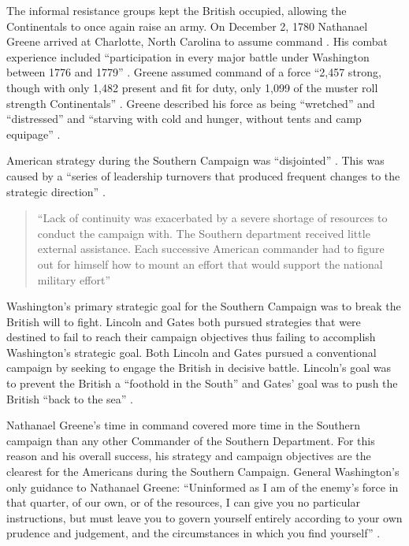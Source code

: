 The informal resistance groups kept the British occupied, allowing the
Continentals to once again raise an army.  On December 2, 1780 Nathanael Greene
arrived at Charlotte, North Carolina to assume command \cite[p.22]{moncure_cowpens_1996}.
His combat experience included “participation in every major battle under
Washington between 1776 and 1779” \cite[5]{babits_devil_2001}.  Greene assumed command of a
force “2,457 strong, though with only 1,482 present and fit for duty, only 1,099
of the muster roll strength Continentals”  \cite[27]{weigley_partisan_1970}.
Greene described his force as being “wretched” and “distressed” and “starving
with cold and hunger, without tents and camp equipage”
\cite[23]{moncure_cowpens_1996}. 

American strategy during the Southern Campaign was “disjointed”
\cite[p.60]{woodward_comparative_2002}.
This was caused by a “series of leadership turnovers that produced
frequent changes to the strategic direction”
\cite[61]{woodward_comparative_2002}.  

\begin{quote}
“Lack of continuity was exacerbated by a severe shortage of resources to conduct
the campaign with.  The Southern department received little external assistance.
Each successive American commander had to figure out for himself how to mount an
effort that would support the national military effort”
\cite[p.61]{woodward_comparative_2002}
\end{quote}

Washington's primary strategic goal for the Southern Campaign was to break the
British will to fight.  Lincoln and Gates both pursued strategies that were
destined to fail to reach their campaign objectives thus failing to accomplish
Washington’s strategic goal.  Both Lincoln and Gates pursued a conventional
campaign by seeking to engage the British in decisive battle.  Lincoln’s goal
was to prevent the British a “foothold in the South” and Gates’ goal was to push
the British “back to the sea” \cite[p.64]{woodward_comparative_2002}. 

Nathanael Greene’s time in command covered more time in the Southern campaign
than any other Commander of the Southern Department.  For this reason and his
overall success, his strategy and campaign objectives are the clearest for the
Americans during the Southern Campaign.  General Washington’s only guidance to
Nathanael Greene:  “Uninformed as I am of the enemy’s force in that quarter, of
our own, or of the resources, I can give you no particular instructions, but
must leave you to govern yourself entirely according to your own prudence and
judgement, and the circumstances in which you find yourself”
\cite[p.63]{woodward_comparative_2002}.

